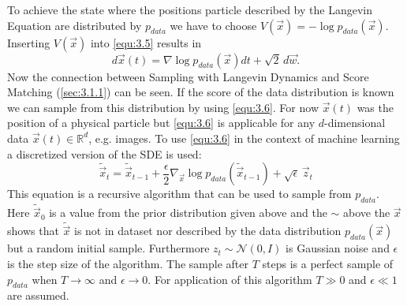 To achieve the state where the positions particle described by the Langevin Equation are distributed by $p_{data}$ we have to choose $V(\vec{x})=-\log p_{data}({\vec{x}})$. Inserting $V(\vec{x})$ into \cref{equ:3.5} results in
%
\begin{equation} \label{equ:3.6}
    d\vec{x}(t)=\nabla\log p_{data}(\vec{x})dt+\sqrt{2}\,d\vec{w}.
\end{equation}
%
Now the connection between Sampling with Langevin Dynamics and Score Matching (\cref{sec:3.1.1}) can be seen. If the score of the data distribution is known we can sample from this distribution by using \cref{equ:3.6}. For now $\vec{x}(t)$ was the position of a physical particle but \cref{equ:3.6} is applicable for any $d$-dimensional data $\vec{x}(t)\in\mathbb{R}^d$, e.g. images. To use \cref{equ:3.6} in the context of machine learning a discretized version of the SDE is used:
%
\begin{equation} \label{equ:3.7}
    \tilde{\vec{x}}_t=\tilde{\vec{x}}_{t-1}+\frac{\epsilon}{2}\nabla_{\vec{x}}\log p_{data}(\tilde{\vec{x}}_{t-1})+\sqrt{\epsilon}\,\vec{z}_t
\end{equation}
%
This equation is a recursive algorithm that can be used to sample from $p_{data}$. Here $\tilde{\vec{x}}_0$ is a value from the prior distribution given above and the $\sim$ above the $\vec{x}$ shows that $\tilde{\vec{x}}$ is not in dataset nor described by the data distribution $p_{data}(\vec{x})$ but a random initial sample. Furthermore $z_t\sim\mathcal{N}(0, I)$ is Gaussian noise and $\epsilon$ is the step size of the algorithm. The sample after $T$ steps is a perfect sample of $p_{data}$ when $T\rightarrow\infty$ and $\epsilon\rightarrow0$. For application of this algorithm $T\gg0$ and $\epsilon\ll1$ are assumed.


